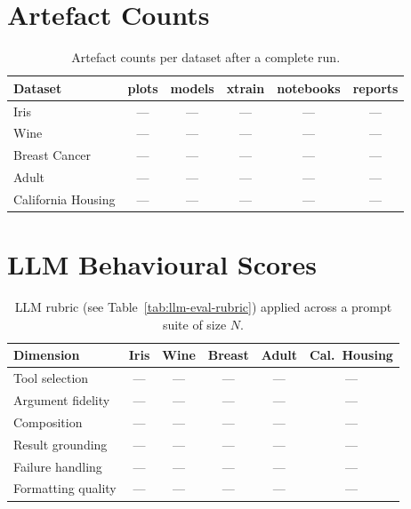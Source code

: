 \section{Artefact Counts}
\label{sec:artefact-counts}

\begin{table}[H]
\centering
\caption{Artefact counts per dataset after a complete run.}
\label{tab:artefacts}
\begin{tabular}{@{}lccccc@{}}
\toprule
\textbf{Dataset} & \textbf{plots} & \textbf{models} & \textbf{xtrain} & \textbf{notebooks} & \textbf{reports} \\
\midrule
Iris & --- & --- & --- & --- & --- \\
Wine & --- & --- & --- & --- & --- \\
Breast Cancer & --- & --- & --- & --- & --- \\
Adult & --- & --- & --- & --- & --- \\
California Housing & --- & --- & --- & --- & --- \\
\bottomrule
\end{tabular}
\end{table}

\section{LLM Behavioural Scores}
\label{sec:llm-scores}

\begin{table}[H]
\centering
\caption{LLM rubric (see Table~\ref{tab:llm-eval-rubric}) applied
across a prompt suite of size $N$.}
\label{tab:llm-scores}
\begin{tabularx}{\linewidth}{@{}Xccccc@{}}
\toprule
\textbf{Dimension} & \textbf{Iris} & \textbf{Wine} & \textbf{Breast} & \textbf{Adult} & \textbf{Cal.\ Housing} \\
\midrule
Tool selection      & --- & --- & --- & --- & --- \\
Argument fidelity   & --- & --- & --- & --- & --- \\
Composition         & --- & --- & --- & --- & --- \\
Result grounding    & --- & --- & --- & --- & --- \\
Failure handling    & --- & --- & --- & --- & --- \\
Formatting quality  & --- & --- & --- & --- & --- \\
\bottomrule
\end{tabularx}
\end{table}
